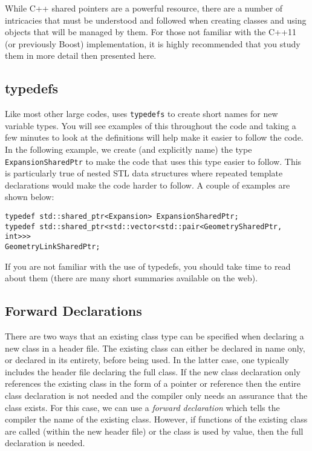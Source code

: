 While C++ shared pointers are a powerful resource, there are a
number of intricacies that must be understood and followed when
creating classes and using objects that will be managed by them.
For those not familiar with the C++11 (or previously Boost)
implementation, it is highly recommended that you study them in more
detail then presented here.
  
\subsection{typedefs}
Like most other large codes, {\nek} uses
\lstinline{typedefs} to create short names for new variable types.  You will
see examples of this throughout the code and taking a few minutes to
look at the definitions will help make it easier to follow the code.
In the following example, we create (and explicitly name) the type
\lstinline{ExpansionSharedPtr} to make the code that uses this type easier
to follow. This is particularly true of nested STL data structures where repeated template declarations would make the code harder to follow. A couple of examples are shown below:
\begin{lstlisting}
typedef std::shared_ptr<Expansion> ExpansionSharedPtr;
typedef std::shared_ptr<std::vector<std::pair<GeometrySharedPtr, int>>>
GeometryLinkSharedPtr;
\end{lstlisting}
If you are not familiar with the use of typedefs, you should take
time to read about them (there are many short summaries
available on the web).

\subsection{Forward Declarations}
There are two ways that an existing class
type can be specified when declaring a new class in a header file.  The
existing class can either be declared in name only, or declared in its entirety, before being used. In the latter case, one typically includes the header file declaring the full class. If the new class declaration only references the existing class in the form of a pointer or reference then the entire class declaration is not needed and the compiler only needs an assurance that the class exists. For this case, we can use a \emph{forward declaration} which tells the compiler the name of the existing class. 
However, if functions of the existing class are called (within the new header file) or the class is used by value, then the full declaration is needed.

